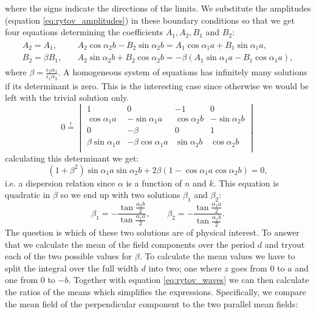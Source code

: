 where the signs indicate the directions of the limits. We substitute the amplitudes (equation \ref{eq:rytov_amplitudes}) in these boundary conditions so that we get four equations determining the coefficients $A_1,A_2,B_1$ and $B_2$:
\begin{align}
\begin{split}
    \label{eq:rytov_waves}
    A_2 = A_1, 
    \quad
    &A_2\cos \alpha_2 b - B_2 \sin \alpha_2 b= A_1 \cos \alpha_1 a + B_1 \sin \alpha_1 a,
    \\
    B_2=\beta B_1,
    \quad
    &A_2 \sin \alpha_2 b + B_2 \cos \alpha_2 b = -\beta (A_1 \sin \alpha_1 a - B_1 \cos \alpha_1 a),
\end{split}
\end{align}
where $\beta = \frac{\epsilon_2 \alpha_1}{\epsilon_1 \alpha_2}$. A homogeneous system of equations has infinitely many solutions if its determinant is zero. This is the interesting case since otherwise we would be left with the trivial solution only. 
\begin{equation}
   0\overset{!}{=}
   \begin{vmatrix} 
   1 & 0 & -1 & 0 \\
   \cos \alpha_1 a & -\sin \alpha_1 a & \cos \alpha_2 b & -\sin \alpha_2 b \\
   0 & -\beta & 0 & 1 \\
   \beta \sin \alpha_1 a & -\beta \cos \alpha_1 a & \sin \alpha_2 b & \cos \alpha_2 b \\
   \end{vmatrix} 
\end{equation}
calculating this determinant we get:
\begin{equation}
    (1+\beta^2) \sin \alpha_1 a \sin \alpha_2 b + 2\beta (1-\cos \alpha_1 a \cos \alpha_2 b) = 0,
\end{equation}
i.e. a dispersion relation since $\alpha$ is a function of $n$ and $k$. This equation is quadratic in $\beta$ so we end up with two solutions $\beta_1$ and $\beta_2$:
\begin{equation}
    \beta_1 = -\frac{\tan \frac{\alpha_2 b}{2}}{\tan \frac{\alpha_1 a}{2}},
    \qquad
    \beta_2 = -\frac{\tan \frac{\alpha_1a}{2}}{\tan \frac{\alpha_2 b}{2}}.
\end{equation}
The question is which of these two solutions are of physical interest. To answer that we calculate the mean of the field components over the period $d$ and tryout each of the two possible values for $\beta$. To calculate the mean values we have to split the integral over the full width $d$ into two; one where $z$ goes from $0$ to $a$ and one from $0$ to $-b$. Together with equation \ref{eq:rytov_waves} we can then calculate the ratios of the means which simplifies the expressions. Specifically, we compare the mean field of the perpendicular component to the two parallel mean fields:
